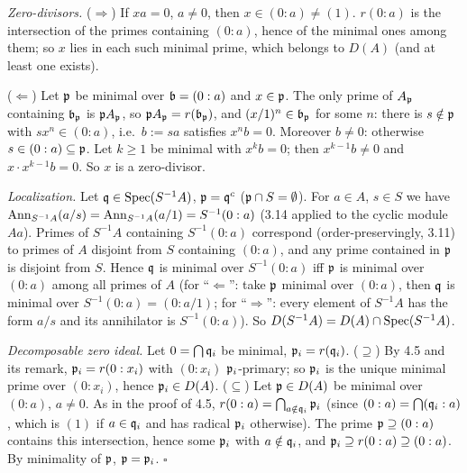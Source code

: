 \documentclass[11pt]{article}
\begin{document}
\pf
\emph{Zero-divisors.} ($\Rightarrow$) If $xa=0$, $a\ne0$, then $x\in(0:a)\ne(1)$. $r(0:a)$ is the intersection of the primes containing $(0:a)$, hence of the minimal ones among them; so $x$ lies in each such minimal prime, which belongs to $D(A)$ (and at least one exists).

($\Leftarrow$) Let $\mathfrak p$ be minimal over $\mathfrak b=(0:a)$ and $x\in\mathfrak p$. The only prime of $A_\mathfrak p$ containing $\mathfrak b_\mathfrak p$ is $\mathfrak p A_\mathfrak p$, so $\mathfrak p A_\mathfrak p=r(\mathfrak b_\mathfrak p)$, and $(x/1)^n\in\mathfrak b_\mathfrak p$ for some $n$: there is $s\notin\mathfrak p$ with $sx^n\in(0:a)$, i.e.\ $b:=sa$ satisfies $x^nb=0$. Moreover $b\ne0$: otherwise $s\in(0:a)\subseteq\mathfrak p$. Let $k\ge1$ be minimal with $x^kb=0$; then $x^{k-1}b\ne0$ and $x\cdot x^{k-1}b=0$. So $x$ is a zero-divisor.

\emph{Localization.} Let $\mathfrak q\in\operatorname{Spec}(S^{-1}A)$, $\mathfrak p=\mathfrak q^c$ ($\mathfrak p\cap S=\emptyset$). For $a\in A$, $s\in S$ we have $\operatorname{Ann}_{S^{-1}A}(a/s)=\operatorname{Ann}_{S^{-1}A}(a/1)=S^{-1}(0:a)$ (3.14 applied to the cyclic module $Aa$). Primes of $S^{-1}A$ containing $S^{-1}(0:a)$ correspond (order-preservingly, 3.11) to primes of $A$ disjoint from $S$ containing $(0:a)$, and any prime contained in $\mathfrak p$ is disjoint from $S$. Hence $\mathfrak q$ is minimal over $S^{-1}(0:a)$ iff $\mathfrak p$ is minimal over $(0:a)$ among all primes of $A$ (for ``$\Leftarrow$'': take $\mathfrak p$ minimal over $(0:a)$, then $\mathfrak q$ is minimal over $S^{-1}(0:a)=(0:a/1)$; for ``$\Rightarrow$'': every element of $S^{-1}A$ has the form $a/s$ and its annihilator is $S^{-1}(0:a)$). So $D(S^{-1}A)=D(A)\cap\operatorname{Spec}(S^{-1}A)$.

\emph{Decomposable zero ideal.} Let $0=\bigcap\mathfrak q_i$ be minimal, $\mathfrak p_i=r(\mathfrak q_i)$. ($\supseteq$) By 4.5 and its remark, $\mathfrak p_i=r(0:x_i)$ with $(0:x_i)$ $\mathfrak p_i$-primary; so $\mathfrak p_i$ is the unique minimal prime over $(0:x_i)$, hence $\mathfrak p_i\in D(A)$. ($\subseteq$) Let $\mathfrak p\in D(A)$ be minimal over $(0:a)$, $a\ne0$. As in the proof of 4.5, $r(0:a)=\bigcap_{a\notin\mathfrak q_i}\mathfrak p_i$ (since $(0:a)=\bigcap(\mathfrak q_i:a)$, which is $(1)$ if $a\in\mathfrak q_i$ and has radical $\mathfrak p_i$ otherwise). The prime $\mathfrak p\supseteq(0:a)$ contains this intersection, hence some $\mathfrak p_i$ with $a\notin\mathfrak q_i$, and $\mathfrak p_i\supseteq r(0:a)\supseteq(0:a)$. By minimality of $\mathfrak p$, $\mathfrak p=\mathfrak p_i$. \hfill$\square$
\end{document}
